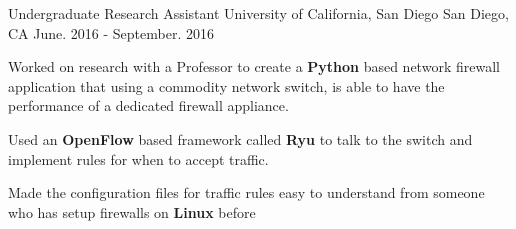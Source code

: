 \begin{cventries}
  
  \cventry
    {Undergraduate Research Assistant} %
    {University of California, San Diego} %
    {San Diego, CA} %
    {June. 2016 - September. 2016} %
    {
      \begin{cvitems} %
        \item {Worked on research with a Professor to create a \textbf{Python} based network firewall application that using  a commodity network switch, is able to have the performance of a dedicated firewall appliance.}
        \item {Used an \textbf{OpenFlow} based framework called \textbf{Ryu} to talk to the switch and implement rules for when to accept traffic.}
        \item {Made the configuration files for traffic rules easy to understand from someone who has setup firewalls on \textbf{Linux}
before}  \end{cvitems}
    }


\end{cventries}
